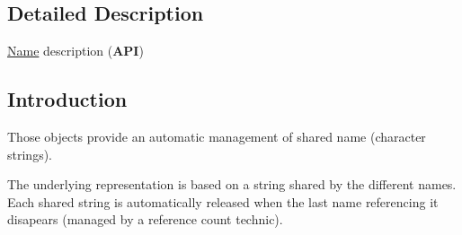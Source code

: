 \subsection{Detailed Description}
\hyperlink{classHurricane_1_1Name}{Name} description ({\bfseries A\-P\-I}) 

\hypertarget{classHurricane_1_1Name_secNameIntro}{}\subsection{Introduction}\label{classHurricane_1_1Name_secNameIntro}
Those objects provide an automatic management of shared name (character strings).

The underlying representation is based on a string shared by the different names. Each shared string is automatically released when the last name referencing it disapears (managed by a reference count technic). 

